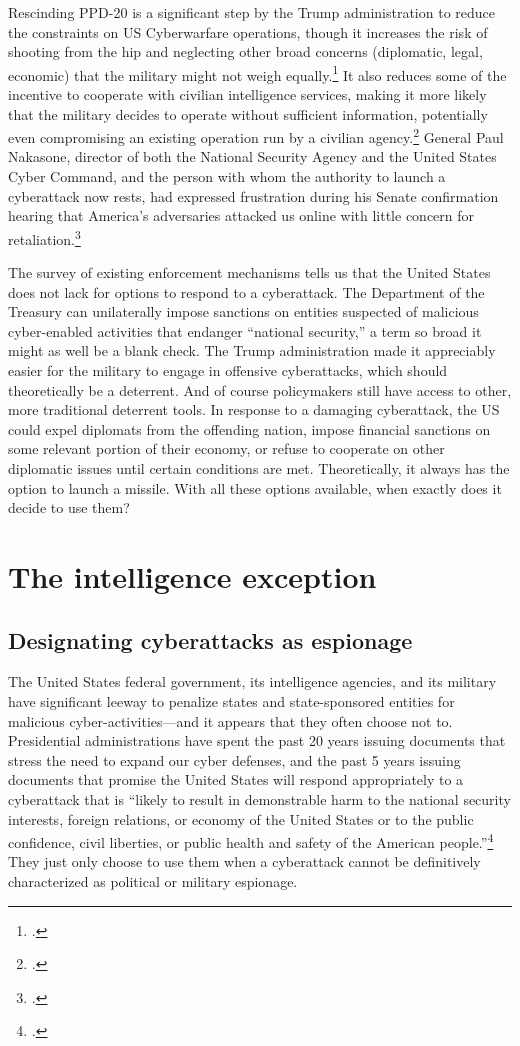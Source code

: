 \documentclass{memoir}
\begin{document}
\begin{refsegment}
Rescinding PPD-20 is a significant step by the Trump administration to reduce the constraints on US Cyberwarfare operations, though it increases the risk of shooting from the hip and neglecting other broad concerns (diplomatic, legal, economic) that the military might not weigh equally.\footcite{starks_ramifications_2018} It also reduces some of the incentive to cooperate with civilian intelligence services, making it more likely that the military decides to operate without sufficient information, potentially even compromising an existing operation run by a civilian agency.\footcite{hawkins_cybersecurity_2018} General Paul Nakasone, director of both the National Security Agency and the United States Cyber Command, and the person with whom the authority to launch a cyberattack now rests, had expressed frustration during his Senate confirmation hearing that America's adversaries attacked us online with little concern for retaliation.\footcite{sanger_trump_2018}

The survey of existing enforcement mechanisms tells us that the United States does not lack for options to respond to a cyberattack. The Department of the Treasury can unilaterally impose sanctions on entities suspected of malicious cyber-enabled activities that endanger ``national security,'' a term so broad it might as well be a blank check. The Trump administration made it appreciably easier for the military to engage in offensive cyberattacks, which should theoretically be a deterrent. And of course policymakers still have access to other, more traditional deterrent tools. In response to a damaging cyberattack, the US could expel diplomats from the offending nation, impose financial sanctions on some relevant portion of their economy, or refuse to cooperate on other diplomatic issues until certain conditions are met. Theoretically, it always has the option to launch a missile. With all these options available, when exactly does it decide to use them?

\section{The intelligence exception}
\subsection{Designating cyberattacks as espionage}
The United States federal government, its intelligence agencies, and its military have significant leeway to penalize states and state-sponsored entities for malicious cyber-activities---and it appears that they often choose not to. Presidential administrations have spent the past 20 years issuing documents that stress the need to expand our cyber defenses, and the past 5 years issuing documents that promise the United States will respond appropriately to a cyberattack that is ``likely to result in demonstrable harm to the national security interests, foreign relations, or economy of the United States or to the public confidence, civil liberties, or public health and safety of the American people.''\footcite{office_of_the_press_secretary_fact_2016} They just only choose to use them when a cyberattack cannot be definitively characterized as political or military espionage.


\end{refsegment}
\end{document}
